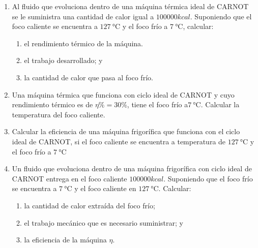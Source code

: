 \documentclass[../main]{subfiles}
\begin{document}
\begin{enumerate}
    fuente caliente.
  \item Al fluido que evoluciona dentro de una máquina térmica ideal
    de CARNOT se le suministra una cantidad de calor igual a
    $100000kcal$. Suponiendo que el foco caliente se encuentra a
    $\SI{127}{\celsius}$ y el foco frío a $\SI{7}{\celsius}$, calcular:
    \begin{enumerate}
      \item el rendimiento térmico de la máquina.
      \item el trabajo desarrollado; y
      \item la cantidad de calor que pasa al foco frío.
    \end{enumerate}
  \item Una máquina térmica que funciona con ciclo ideal de CARNOT y
    cuyo rendimiento térmico es de $\eta\%=30\%$, tiene el foco frío
    a$\SI{7}{\celsius}$. Calcular la temperatura del foco caliente.
  \item Calcular la eficiencia de una máquina frigorífica que
    funciona con el ciclo ideal de CARNOT, si el foco caliente se
    encuentra a temperatura de $\SI{127}{\celsius}$ y el foco frío a
    $\SI{7}{\celsius}$
  \item Un fluido que evoluciona dentro de una máquina frigorífica
    con ciclo ideal de CARNOT entrega en el foco caliente $100000
    kcal$. Suponiendo que el foco frío se encuentra a
    $\SI{7}{\celsius}$ y el foco caliente en $\SI{127}{\celsius}$. Calcular:
    \begin{enumerate}
      \item la cantidad de calor extraída del foco frío;
      \item el trabajo mecánico que es necesario suministrar; y
      \item la eficiencia de la máquina $\eta$.
    \end{enumerate}
\end{enumerate}
\end{document}
